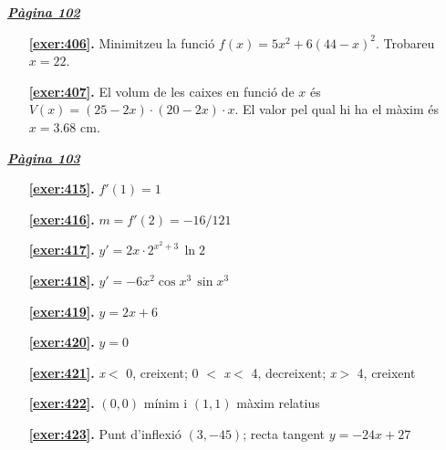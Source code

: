 
\hyperlink{page.102}{\textbf{\em Pàgina 102}}
\begin{enumerate}
\item[\fontfamily{phv}\selectfont\color{blue}\textbf{\ref{exer:406}. }] \label{ans:406} 
Minimitzeu la funció $f(x)=5x^2+6(44-x)^2$. Trobareu $x=22$.
 \end{enumerate}
\begin{enumerate}
\item[\fontfamily{phv}\selectfont\color{blue}\textbf{\ref{exer:407}. }] \label{ans:407} 
El volum de les caixes en funció de $x$ és $V(x)=(25-2x)\cdot (20-2x)\cdot x$. El valor pel qual hi ha el màxim és $x=3.68$ cm.
 \end{enumerate}
\vspace{0.3cm}


\hyperlink{page.103}{\textbf{\em Pàgina 103}}
\begin{enumerate}
\item[\fontfamily{phv}\selectfont\color{blue}\textbf{\ref{exer:415}. }] \label{ans:415} 
$f'(1)=1$
 \end{enumerate}
\begin{enumerate}
\item[\fontfamily{phv}\selectfont\color{blue}\textbf{\ref{exer:416}. }] \label{ans:416} 
$m=f'(2)=-16/121$
\item[\fontfamily{phv}\selectfont\color{blue}\textbf{\ref{exer:417}. }] \label{ans:417} 
$y'=2x \cdot 2^{x^2+3} \, \ln 2$ 
\item[\fontfamily{phv}\selectfont\color{blue}\textbf{\ref{exer:418}. }] \label{ans:418} 
$y'=-6x^2\cos x^3 \, \sin x^3 $
\item[\fontfamily{phv}\selectfont\color{blue}\textbf{\ref{exer:419}. }] \label{ans:419} 
$y = 2x + 6$
\item[\fontfamily{phv}\selectfont\color{blue}\textbf{\ref{exer:420}. }] \label{ans:420} 
$y=0$
\item[\fontfamily{phv}\selectfont\color{blue}\textbf{\ref{exer:421}. }] \label{ans:421} 
\textit {x}$<$ 0, creixent; 0 $<$ \textit {x}$<$ 4, decreixent; \textit {x}$>$ 4, creixent
\item[\fontfamily{phv}\selectfont\color{blue}\textbf{\ref{exer:422}. }] \label{ans:422} 
$(0, 0)$ mínim i $(1, 1)$ màxim relatius
\item[\fontfamily{phv}\selectfont\color{blue}\textbf{\ref{exer:423}. }] \label{ans:423} 
Punt d'inflexió $(3, -45)$; recta tangent $y=-24x+27$
 \end{enumerate}

